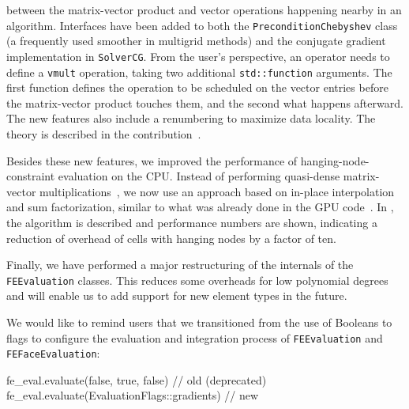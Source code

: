 \documentclass{ansarticle-preprint}
\begin{document}
\begin{itemize}
  between the matrix-vector product and vector operations happening nearby in
  an algorithm. Interfaces have been added to both the
  \texttt{PreconditionChebyshev} class (a frequently used smoother in multigrid
  methods) and the conjugate gradient implementation in \texttt{SolverCG}.
  From the user's perspective, an operator needs to define a \texttt{vmult} operation,
  taking two additional \texttt{std::function} arguments. The first function
  defines the operation to be scheduled on the vector entries before the
  matrix-vector product touches them, and the second what happens
  afterward. The new features also include a renumbering to maximize data
  locality. The theory is described in the
  contribution~\cite{kronbichler2022cg}.
\end{itemize}
Besides these new features, we improved the performance of
hanging-node-constraint evaluation on the CPU. Instead of performing
quasi-dense matrix-vector multiplications~\cite{KronbichlerKormann2012}, we now use an
approach based on in-place interpolation and sum factorization, similar
to what was already done in the GPU code~\cite{ljungkvist2017matrix}. In \cite{munch2022hn}, the algorithm is described
and performance numbers are shown, indicating a reduction
of overhead of cells with hanging nodes by a factor of ten.

Finally, we have performed a major restructuring of the internals
of the \texttt{FEEvaluation} classes. This reduces some overheads for low polynomial degrees and will enable us to add support for new element types in the future.

We would like to remind users that we transitioned from the use of Booleans
to flags to configure the evaluation and integration process of \texttt{FEEvaluation}
and \texttt{FEFaceEvaluation}:

\begin{c++}
fe_eval.evaluate(false, true, false)         // old (deprecated)
fe_eval.evaluate(EvaluationFlags::gradients) // new
\end{c++}

%
%
%
%
%
\end{document}
